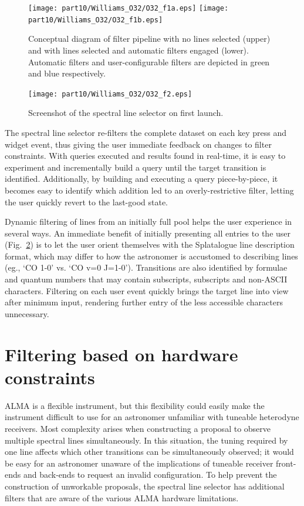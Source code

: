 \begin{figure}
	\texttt{[image: part10/Williams\_O32/O32\_f1a.eps]}
	\texttt{[image: part10/Williams\_O32/O32\_f1b.eps]}
	\caption{Conceptual diagram of filter pipeline with no lines selected (upper) and with lines selected and automatic filters engaged (lower). Automatic filters and user-configurable filters are depicted in green and blue respectively.}
	\label{fig:pipeline}
\end{figure}

\begin{figure}
	\texttt{[image: part10/Williams\_O32/O32\_f2.eps]}
	\caption{Screenshot of the spectral line selector on first launch.}
	\label{fig:Wscreenshot}
\end{figure}

The spectral line selector re-filters the complete dataset on each key press and widget event, thus giving the user immediate feedback on changes to filter constraints. With queries executed and results found in real-time, it is easy to experiment and incrementally build a query until the target transition is identified. Additionally, by building and executing a query piece-by-piece, it becomes easy to identify which addition led to an overly-restrictive filter, letting the user quickly revert to the last-good state.

Dynamic filtering of lines from an initially full pool helps the user experience in several ways. An immediate benefit of initially presenting all entries to the user (Fig.~\ref{fig:Wscreenshot}) is to let the user orient themselves with the Splatalogue line description format, which may differ to how the astronomer is accustomed to describing lines (eg., `CO 1-0' vs. `CO v=0 J=1-0'). Transitions are also identified by formulae and quantum numbers that may contain subscripts, subscripts and non-ASCII characters. Filtering on each user event quickly brings the target line into view after minimum input, rendering further entry of the less accessible characters unnecessary.

\section{Filtering based on hardware constraints}
\label{sec:hardware filters}
ALMA is a flexible instrument, but this flexibility could easily make the instrument difficult to use for an astronomer unfamiliar with tuneable heterodyne receivers. Most complexity arises when constructing a proposal to observe multiple spectral lines simultaneously. In this situation, the tuning required by one line affects which other transitions can be simultaneously observed; it would be easy for an astronomer unaware of the implications of tuneable receiver front-ends and back-ends to request an invalid configuration. To help prevent the construction of unworkable proposals, the spectral line selector has additional filters that are aware of the various ALMA hardware limitations. 

